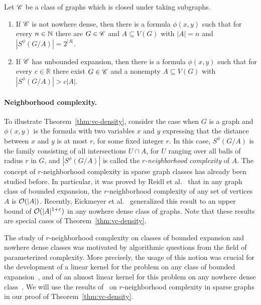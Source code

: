  \setcounter{vclower}{\value{theorem}}
   \begin{theorem}\label{thm:vc-density-lower-bound}
  Let $\mathscr{C}$ be a class of graphs which 
  is closed under taking subgraphs. 
  \begin{enumerate}
  \item If $\mathscr{C}$ is not nowhere dense, then there is a formula 
  $\phi(x,y)$ such that for every $n\in \mathbb{N}$ there are $G\in\mathscr{C}$ and $A\subseteq V(G)$ 
  with $|A|=n$ and $|S^\phi(G/A)|=2^{|A|}$. 
  \item If $\mathscr{C}$ has unbounded expansion, then there is a formula 
  $\phi(x,y)$ such that for every $c\in \mathbb{R}$ there exist $G\in\mathscr{C}$ and a nonempty $A\subseteq V(G)$ with $|S^\phi(G/A)|>c|A|$. 
  \end{enumerate}
\end{theorem}

\paragraph{Neighborhood complexity.}
To illustrate Theorem~\ref{thm:vc-density}, consider the case when
$G$ is a graph and  $\phi(x,y)$ is the formula with two variables $x$ and $y$ expressing that the distance between $x$ and $y$
is at most $r$, for some fixed integer $r$. In this case, $S^\phi(G/A)$ is the family consisting of all intersections $U\cap A$, for $U$ ranging over all balls of radius $r$ in $G$,
and  $|S^\phi(G/A)|$ is called the \emph{$r$-neighborhood complexity} of $A$.
The concept of $r$-neighborhood complexity in sparse graph classes has already been studied before.
In particular, it was proved by Reidl et al.~\cite{reidl2016characterising} that in any graph class of bounded expansion, the $r$-neighborhood complexity of any set of vertices $A$ is $\mathcal{O}(|A|)$.
Recently, Eickmeyer et al.~\cite{eickmeyer2016neighborhood} generalized this result to an upper bound of $\mathcal{O}(|A|^{1+\varepsilon})$ in any nowhere dense class of graphs.
Note that these results are special cases of Theorem~\ref{thm:vc-density}.

The study of $r$-neighborhood complexity on classes of bounded expansion and nowhere dense classes was motivated by algorithmic questions from the field of parameterized complexity.
More precisely, the usage of this notion was crucial for the development of a linear kernel for the {} problem on any class of bounded expansion~\cite{drange2016kernelization},
and of an almost linear kernel for this problem on any nowhere dense class~\cite{eickmeyer2016neighborhood}.
We will use the results of~\cite{drange2016kernelization,eickmeyer2016neighborhood,reidl2016characterising} on $r$-neighborhood complexity in sparse graphs in our proof of Theorem~\ref{thm:vc-density}.

